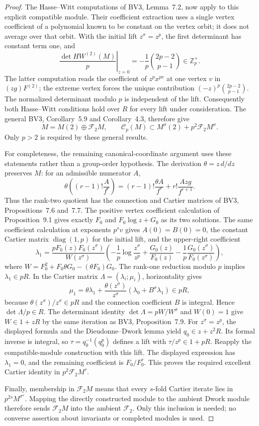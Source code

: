 \documentclass[11pt,a4paper]{article}
\theoremstyle{definition}\newtheorem{definition}[theorem]{Definition}
\theoremstyle{remark}\newtheorem{remark}[theorem]{Remark}
\numberwithin{equation}{section}
\begin{document}
\begin{proof}
The Hasse--Witt computations of BV3, Lemma~7.2, now apply to this
explicit compatible module. Their coefficient extraction uses a
single vertex coefficient of a polynomial known to be constant on
the vertex orbit; it does not average over that orbit. With the
initial lift $z^\sigma=z^p$, the first determinant has constant
term one, and
\[
 \left.\frac{\det HW^{(2)}(M)}p\right|_{z=0}
 =-\frac1p\binom{2p-2}{p-1}\in\mathbb Z_p^\times.
\]
The latter computation reads the coefficient of $z^px^{pv}$ at one
vertex $v$ in $(zg)F^{(2)}$; the extreme vertex forces the unique
contribution $(-z)^p\binom{2p-2}{p-1}$. The normalized determinant
modulo $p$ is independent of the lift. Consequently both
Hasse--Witt conditions hold over $R$ for every lift under consideration.
The general BV3, Corollary~5.9 and Corollary~4.3, therefore give
\[
 M=M(2)\oplus\mathscr F_2M,
 \qquad
 \mathscr C_p(M)\subset M^\sigma(2)+p^2\mathscr F_2M^\sigma.
\]
Only $p>2$ is required by these general results.

For completeness, the remaining canonical-coordinate argument
uses these statements rather than a group-order hypothesis.
The derivation $\theta=z\,d/dz$ preserves $M$: for an admissible
numerator $A$,
\[
 \theta\left((r-1)!\frac{A}{f^r}\right)
 =(r-1)!\frac{\theta A}{f^r}
       +r!\frac{Azg}{f^{r+1}}.
\]
Thus the rank-two
quotient has the connection and Cartier matrices of BV3,
Propositions~7.6 and~7.7. The positive vertex coefficient calculation
of Proposition~9.1 gives exactly $F_0$ and
$F_0\log z+G_0$ as its two solutions. The same coefficient
calculation at exponents $p^sv$ gives $A(0)=B(0)=0$, the
constant Cartier matrix $\operatorname{diag}(1,p)$ for the
initial lift, and the upper-right coefficient
\[
 \lambda_1=
 \frac{pF_0(z)F_0(z^\sigma)}{W(z^\sigma)}
 \left(-\frac1p\log\frac{z^\sigma}{z^p}
 +\frac{G_0(z)}{F_0(z)}
 -\frac1p\frac{G_0(z^\sigma)}{F_0(z^\sigma)}\right),
\]
where $W=F_0^2+F_0\theta G_0-(\theta F_0)G_0$.
The rank-one reduction modulo $p$ implies $\lambda_1\in pR$.
In the Cartier matrix $\Lambda=(\lambda_i;\mu_i)$, horizontality
gives
\[
 \mu_1=\theta\lambda_1+
       \frac{\theta(z^\sigma)}{z^\sigma}
              (\lambda_0+B^\sigma\lambda_1)\in pR,
\]
because $\theta(z^\sigma)/z^\sigma\in pR$ and the connection
coefficient $B$ is integral.  Hence $\det\Lambda/p\in R$.
The determinant identity
$\det\Lambda=pW/W^\sigma$ and $W(0)=1$ give $W\in1+zR$
by the same iteration as BV3, Proposition~7.9.
For $z^\sigma=z^p$, the displayed formula and the
Dieudonne--Dwork lemma yield $q_0\in z+z^2R$.
Its formal inverse is integral, so
$\tau=q_0^{-1}(q_0^p)$ defines a lift with
$\tau/z^p\in1+pR$. Reapply the compatible-module construction
with this lift. The displayed expression has $\lambda_1=0$,
and the remaining coefficient is $F_0/F_0^\tau$.
This proves the required excellent Cartier identity in
$p^2\mathscr F_2M^\tau$.

Finally, membership in $\mathscr F_2M$ means that every $s$-fold
Cartier iterate lies in $p^{2s}M^{\sigma^s}$. Mapping the directly
constructed module to the ambient Dwork module therefore sends
$\mathscr F_2M$ into the ambient $\mathscr F_2$.
Only this inclusion is needed; no converse assertion about
invariants or completed modules is used.
\end{proof}
\end{document}
